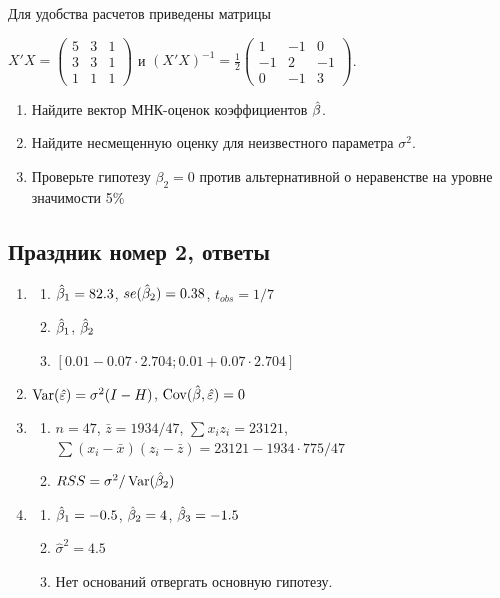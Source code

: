 \documentclass[12pt, a4paper]{article}
\begin{document}
\begin{enumerate}
Для удобства расчетов приведены матрицы


$X'X=\left(
\begin{array}{ccc}
5 & 3 & 1\\
3 & 3 & 1\\
1 & 1 & 1
\end{array}\right)$ и $(X'X)^{-1}=\frac{1}{2}\left(
\begin{array}{ccc}
1 & -1 & 0 \\
-1 & 2 & -1 \\
0 & -1 & 3
\end{array}\right)$.

\begin{enumerate}
\item Найдите вектор МНК-оценок коэффициентов $\hat{\beta}$.
\item Найдите несмещенную оценку для неизвестного параметра $\sigma^2$.
\item Проверьте гипотезу $\beta_2=0$ против альтернативной о неравенстве на уровне значимости 5\%
\end{enumerate}


\end{enumerate}



\subsection{Праздник номер 2, ответы}

\begin{enumerate}
\item
\begin{enumerate}
\item $\hat{\beta}_1 = 82.3$, $se(\hat{\beta}_2) = 0.38$, $t_{obs} = 1/7$
\item $\hat{\beta}_1$, $\hat{\beta}_2$
\item $[0.01 - 0.07 \cdot 2.704; 0.01 + 0.07 \cdot 2.704]$
\end{enumerate}
\item $\operatorname{Var}(\hat{\varepsilon}) = \sigma^2 (I - H)$, $\operatorname{Cov}(\hat{\beta},\hat{\varepsilon}) = 0$
\item
\begin{enumerate}
\item $n = 47$, $\bar{z} = 1934 / 47$, $\sum x_i z_i = 23121$, $\sum(x_i-\bar{x})(z_i-\bar{z}) = 23121 - 1934 \cdot 775 / 47$
\item $RSS = \sigma^2 / \operatorname{Var}(\hat{\beta}_2)$
\end{enumerate}
\item
\begin{enumerate}
\item $\hat{\beta}_1 = -0.5$, $\hat{\beta}_2 = 4$, $\hat{\beta}_3 = -1.5$
\item $\hat{\sigma}^2 = 4.5$
\item Нет оснований отвергать основную гипотезу.
\end{enumerate}
\end{enumerate}
\end{document}
